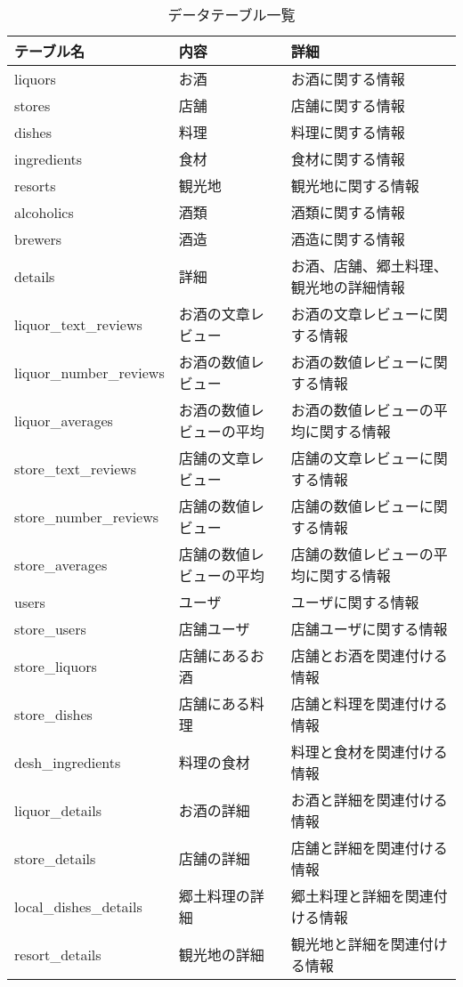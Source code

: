 \documentclass[a4j,titlepage]{jarticle}
\begin{document}
\begin{table}[!htbp]
\caption{データテーブル一覧}
\label{tables}
\begin{center}
\begin{tabular}{|l|l|l|}\hline
テーブル名 & 内容 & 詳細\\\hline\hline
liquors & お酒 & お酒に関する情報\\\hline
stores & 店舗 & 店舗に関する情報\\\hline
dishes & 料理 & 料理に関する情報\\\hline
ingredients & 食材 & 食材に関する情報\\\hline
resorts & 観光地 & 観光地に関する情報\\\hline
alcoholics & 酒類 & 酒類に関する情報\\\hline
brewers & 酒造 & 酒造に関する情報\\\hline
details & 詳細 & お酒、店舗、郷土料理、観光地の詳細情報\\\hline
liquor\_text\_reviews & お酒の文章レビュー & お酒の文章レビューに関する情報\\\hline
liquor\_number\_reviews & お酒の数値レビュー & お酒の数値レビューに関する情報\\\hline
liquor\_averages & お酒の数値レビューの平均 & お酒の数値レビューの平均に関する情報\\\hline
store\_text\_reviews & 店舗の文章レビュー & 店舗の文章レビューに関する情報\\\hline
store\_number\_reviews & 店舗の数値レビュー & 店舗の数値レビューに関する情報\\\hline
store\_averages & 店舗の数値レビューの平均 & 店舗の数値レビューの平均に関する情報\\\hline
users & ユーザ & ユーザに関する情報\\\hline
store\_users & 店舗ユーザ & 店舗ユーザに関する情報\\\hline
store\_liquors & 店舗にあるお酒 & 店舗とお酒を関連付ける情報\\\hline
store\_dishes & 店舗にある料理 & 店舗と料理を関連付ける情報\\\hline
desh\_ingredients & 料理の食材 & 料理と食材を関連付ける情報\\\hline
liquor\_details & お酒の詳細 & お酒と詳細を関連付ける情報\\\hline
store\_details & 店舗の詳細 & 店舗と詳細を関連付ける情報\\\hline
local\_dishes\_details & 郷土料理の詳細 & 郷土料理と詳細を関連付ける情報\\\hline
resort\_details & 観光地の詳細 & 観光地と詳細を関連付ける情報\\\hline
\end{tabular}
\end{center}
\end{table}
\end{document}
